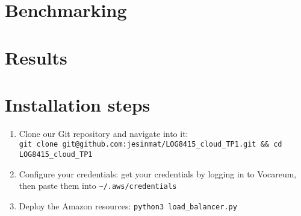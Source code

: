 \documentclass[]{article}
\begin{document}
\section{Benchmarking}

\section{Results}

\section{Installation steps}

\begin{enumerate}
	\item Clone our Git repository and navigate into it: \\
	\verb|git clone git@github.com:jesinmat/LOG8415_cloud_TP1.git && cd LOG8415_cloud_TP1|
	\item Configure your credentials: get your credentials by logging in to Vocareum, then paste them into \verb|~/.aws/credentials|
	\item Deploy the Amazon resources: \verb|python3 load_balancer.py|
\end{enumerate}
\end{document}
